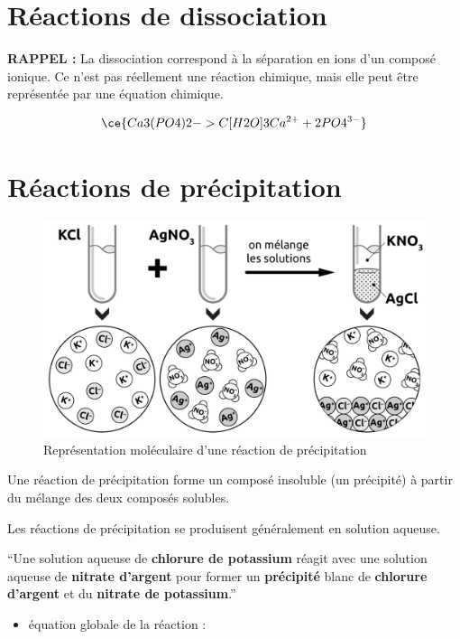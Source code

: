 \documentclass[
  11pt,
  french,
  a4paper,
  openany]{book}
\providecommand{\tightlist}{%
  \setlength{\itemsep}{0pt}\setlength{\parskip}{0pt}}
\begin{document}
\hypertarget{ruxe9actions-de-dissociation}{%
\section{Réactions de dissociation}\label{ruxe9actions-de-dissociation}}

\textbf{RAPPEL :} La dissociation correspond à la séparation en ions d'un composé ionique. Ce n'est pas réellement une réaction chimique, mais elle peut être représentée par une équation chimique.

\[ \ce{Ca3(PO4)2 ->C[H2O] 3Ca^{2+} + 2PO4^{3-}} \]

\hypertarget{ruxe9actions-de-pruxe9cipitation}{%
\section{Réactions de précipitation}\label{ruxe9actions-de-pruxe9cipitation}}

\begin{figure}

{\centering \includegraphics[width=0.5\linewidth]{images/precipitation-0} 

}

\caption{Représentation moléculaire d'une réaction de précipitation}\label{fig:precipitation-0}
\end{figure}

Une réaction de précipitation forme un composé insoluble (un précipité) à partir du mélange des deux composés solubles.

Les réactions de précipitation se produisent généralement en solution aqueuse.

``Une solution aqueuse de \textbf{chlorure de potassium} réagit avec une solution aqueuse de \textbf{nitrate d'argent} pour former un \textbf{précipité} blanc de \textbf{chlorure d'argent} et du \textbf{nitrate de potassium}.''

\begin{itemize}
\tightlist
\item
  équation globale de la réaction :
\end{itemize}
\end{document}
